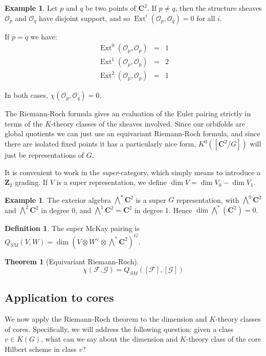 \documentclass{amsart}[12pt]
\theoremstyle{definition}
\newtheorem{theorem}[dummy]{Theorem}
\newtheorem{example}[dummy]{Example}
\newtheorem{definition}[dummy]{Definition}
\newcommand{\Z}{\mathbf{Z}}
\newcommand{\C}{\mathbf{C}}
\DeclareMathOperator{\Ext}{Ext}
\begin{document}
\begin{example}
Let $p$ and $q$ be two points of $\C^2$.  If $p\neq q$, then the structure sheaves $\mathcal{O}_p$ and $\mathcal{O}_q$ have disjoint support, and so $\Ext^i(\mathcal{O}_p,\mathcal{O}_q)=0$ for all $i$.

If $p=q$ we have:
\begin{eqnarray*}
\Ext^0(\mathcal{O}_p,\mathcal{O}_p)&=&1\\
\Ext^1(\mathcal{O}_p,\mathcal{O}_p)&=&2\\
\Ext^2(\mathcal{O}_p,\mathcal{O}_p)&=&1 
\end{eqnarray*}

In both cases, $\chi(\mathcal{O}_p,\mathcal{O}_q)=0$.
\end{example}

The Riemann-Roch formula gives an evaluation of the Euler pairing strictly in terms of the $K$-theory classes of the sheaves involved.  Since our orbifolds are global quotients we can just use an equivariant Riemann-Roch formula, and since there are isolated fixed points it has a particularly nice form,  $K^0([\C^2/G])$ will just be representations of $G$.


It is convenient to work in the \emph{super}-category, which simply means to introduce a $\Z_2$ grading.  If $V$ is a super representation, we define $\dim V=\dim V_0-\dim V_1$.

\begin{example} 
The exterior algebra $\bigwedge^*\C^2$ is a super $G$ representation, with $\bigwedge^0\C^2$ and $\bigwedge^2\C^2$ in degree 0, and $\bigwedge^1\C^2=\C^2$ in degree 1.  Hence $\dim \bigwedge^*(\C^2)=0$.
\end{example}

\begin{definition}
The super McKay pairing is $Q_{SM}(V,W)=\dim (V\otimes W^\vee\otimes\bigwedge^*\C^2)^G$.
\end{definition}


\begin{theorem}[Equivariant Riemann-Roch]
$$\chi(\mathcal{F},\mathcal{G})=Q_{SM}([\mathcal{F}],[\mathcal{G}])$$
\end{theorem}


\subsection{Application to cores}

We now apply the Riemann-Roch theorem to the dimension and $K$-theory classes of cores.  Specifically, we will address the following question: given a class $v\in \overline{K}(G)$, what can we say about the dimension and $K$-theory class of the core Hilbert scheme in class $v$?
\end{document}
